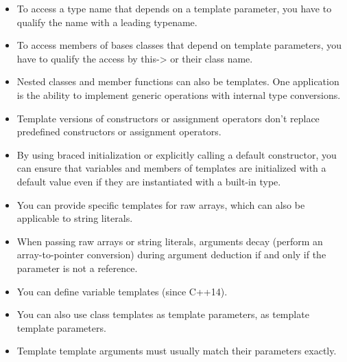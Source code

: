 
\begin{itemize}
\item 
To access a type name that depends on a template parameter, you have to qualify the name with a leading typename.

\item 
To access members of bases classes that depend on template parameters, you have to qualify the access by this-> or their class name.

\item 
Nested classes and member functions can also be templates. One application is the ability to implement generic operations with internal type conversions.

\item 
Template versions of constructors or assignment operators don’t replace predefined constructors or assignment operators.

\item 
By using braced initialization or explicitly calling a default constructor, you can ensure that variables and members of templates are initialized with a default value even if they are instantiated with a built-in type.

\item 
You can provide specific templates for raw arrays, which can also be applicable to string literals.

\item 
When passing raw arrays or string literals, arguments decay (perform an array-to-pointer conversion) during argument deduction if and only if the parameter is not a reference.

\item 
You can define variable templates (since C++14).

\item 
You can also use class templates as template parameters, as template template parameters.

\item 
Template template arguments must usually match their parameters exactly.
\end{itemize}